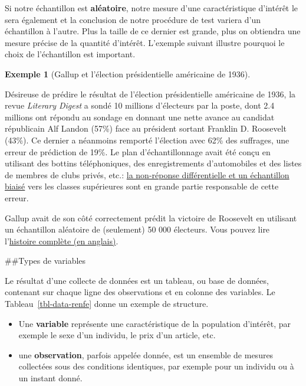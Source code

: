 \documentclass[
  11pt,
  letterpaper,
]{scrbook}
\providecommand{\tightlist}{%
  \setlength{\itemsep}{0pt}\setlength{\parskip}{0pt}}\usepackage{longtable,booktabs,array}
\theoremstyle{definition}
\theoremstyle{definition}
\newtheorem{example}{Exemple}[chapter]
\theoremstyle{remark}
\begin{document}
Si notre échantillon est \textbf{aléatoire}, notre mesure d'une
caractéristique d'intérêt le sera également et la conclusion de notre
procédure de test variera d'un échantillon à l'autre. Plus la taille de
ce dernier est grande, plus on obtiendra une mesure précise de la
quantité d'intérêt. L'exemple suivant illustre pourquoi le choix de
l'échantillon est important.

\begin{example}[Gallup et l'élection présidentielle américaine de
1936]\protect\hypertarget{exm-Gallup}{}\label{exm-Gallup}

Désireuse de prédire le résultat de l'élection présidentielle américaine
de 1936, la revue \emph{Literary Digest} a sondé 10 millions d'électeurs
par la poste, dont 2.4 millions ont répondu au sondage en donnant une
nette avance au candidat républicain Alf Landon (57\%) face au président
sortant Franklin D. Roosevelt (43\%). Ce dernier a néanmoins remporté
l'élection avec 62\% des suffrages, une erreur de prédiction de 19\%. Le
plan d'échantillonnage avait été conçu en utilisant des bottins
téléphoniques, des enregistrements d'automobiles et des listes de
membres de clubs privés, etc.:
\href{https://www.jstor.org/stable/2749114}{la non-réponse
différentielle et un échantillon biaisé} vers les classes supérieures
sont en grande partie responsable de cette erreur.

Gallup avait de son côté correctement prédit la victoire de Roosevelt en
utilisant un échantillon aléatoire de (seulement) 50 000 électeurs. Vous
pouvez lire
l'\href{https://ozanozbey.medium.com/two-lessons-of-sampling-bias-from-1936-us-election-e4e96bd42be}{histoire
complète (en anglais)}.

\end{example}

\#\#Types de variables

Le résultat d'une collecte de données est un tableau, ou base de
données, contenant sur chaque ligne des observations et en colonne des
variables. Le Tableau~\ref{tbl-data-renfe} donne un exemple de
structure.

\begin{itemize}
\tightlist
\item
  Une \textbf{variable} représente une caractéristique de la population
  d'intérêt, par exemple le sexe d'un individu, le prix d'un article,
  etc.
\item
  une \textbf{observation}, parfois appelée donnée, est un ensemble de
  mesures collectées sous des conditions identiques, par exemple pour un
  individu ou à un instant donné.
\end{itemize}
\end{document}
